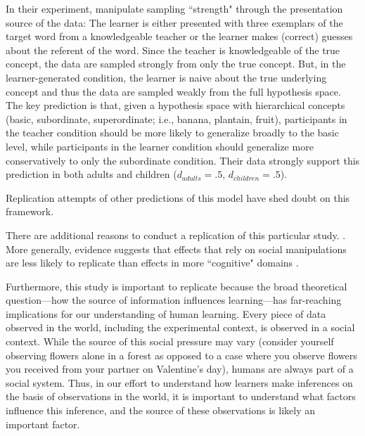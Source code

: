 \documentclass[man]{apa2}
\begin{document}
In their experiment,  manipulate  sampling  ``strength"  through  the presentation source of the data: The learner is either presented with three exemplars of the target word from a knowledgeable teacher or the learner makes (correct) guesses about the referent of the word. Since the teacher is knowledgeable of the true concept, the data are sampled strongly from only the true concept. But, in the learner-generated condition, the learner is naive about the true underlying concept and thus the data are sampled weakly from the full hypothesis space.  The key prediction is that, given a hypothesis space with hierarchical concepts (basic, subordinate, superordinate; i.e.,  banana, plantain, fruit),  participants in the teacher condition should be more likely to generalize broadly to the basic level, while participants in the learner condition should generalize more conservatively to only the subordinate condition. Their data strongly support this prediction in both adults and children ($d_{adults} = .5$, $d_{children} = .5$). %


Replication attempts of other predictions of this model have shed doubt on this framework.
\cite{spencer2011}
\cite{jenkins2015non}


There are additional reasons to conduct a replication of this particular study. \cite{navarro2012sampling}. More generally, evidence suggests that effects that rely on social manipulations are less likely to replicate than effects in more ``cognitive" domains \cite{reproProj2015}.

Furthermore, this study is important to replicate because the broad theoretical question---how the source of information influences learning---has far-reaching implications for our understanding of human learning. Every piece of data observed in the world, including the experimental context,  is observed in a social context. While the source of this social pressure may vary (consider yourself observing flowers  alone in a forest as opposed to a case where you observe flowers you received from your partner on Valentine's day), humans are always part of a social system. Thus, in our effort to understand how learners make inferences on the basis of observations in the world, it is important to understand what factors influence this inference, and the source of these observations is likely an important factor.
\end{document}
